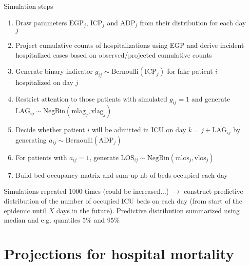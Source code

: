 \documentclass[t,9pt,xcolor=dvipsnames]{beamer}              %
\begin{document}
\begin{frame}{Simulation steps}

\begin{enumerate}
\item Draw parameters $\text{EGP}_{j}$, $\text{ICP}_{j}$ and $\text{ADP}_{j}$ from their distribution for each day $j$
\item Project cumulative counts of hospitalizations using EGP and derive incident hospitalized cases based on observed/projected cumulative counts
\item Generate binary indicator $g_{ij} \sim \text{Bernoulli}(\text{ICP}_{j})$ for fake patient $i$ hospitalized on day $j$
\item Restrict attention to those patients with simulated $g_{ij}=1$ and generate $\text{LAG}_{ij} \sim \text{NegBin}(\text{mlag}_{j},\text{vlag}_{j})$
\item Decide whether patient $i$ will be admitted in ICU on day $k=j+\text{LAG}_{ij}$ by generating $a_{ij} \sim \text{Bernoulli}(\text{ADP}_{j})$
\item For patients with $a_{ij}=1$, generate $\text{LOS}_{ij} \sim \text{NegBin}(\text{mlos}_{j},\text{vlos}_{j})$
\item Build bed occupancy matrix and sum-up nb of beds occupied each day
\end{enumerate}

Simulations repeated 1000 times (could be increased...) $\rightarrow$ construct \alert{predictive distribution of the number of occupied ICU beds on each day} (from start of the epidemic until $X$ days in the future). Predictive distribution summarized using median and e.g. quantiles 5\% and 95\%

\note{
\tiny
\justifying

}
\end{frame}

\section{Projections for hospital mortality}
\note{
\tiny
\justifying

}
\end{document}
